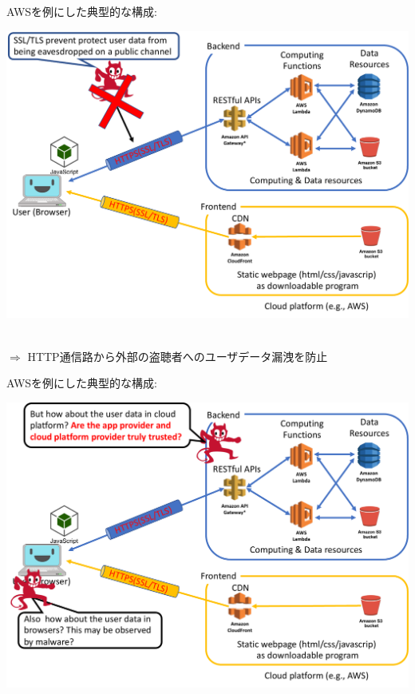 \documentclass[12pt,dvipdfmx]{beamer}
\begin{document}
\begin{frame}
AWSを例にした典型的な構成:
\begin{center}
\includegraphics[width=0.85\linewidth]{Figs/spa2.pdf}
\end{center}
\\
$\Rightarrow$ HTTP通信路から外部の盗聴者へのユーザデータ漏洩を防止
\end{frame}

\begin{frame}
AWSを例にした典型的な構成:
\begin{center}
\includegraphics[width=0.85\linewidth]{Figs/spa3.pdf}
\end{center}
\end{frame}
\end{document}
